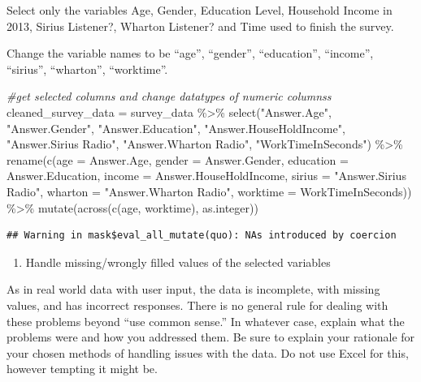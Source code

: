 \documentclass[
]{article}
\newenvironment{Shaded}{\begin{snugshade}}{\end{snugshade}}
\newcommand{\AttributeTok}[1]{\textcolor[rgb]{0.77,0.63,0.00}{#1}}
\newcommand{\CommentTok}[1]{\textcolor[rgb]{0.56,0.35,0.01}{\textit{#1}}}
\newcommand{\FunctionTok}[1]{\textcolor[rgb]{0.00,0.00,0.00}{#1}}
\newcommand{\NormalTok}[1]{#1}
\newcommand{\OtherTok}[1]{\textcolor[rgb]{0.56,0.35,0.01}{#1}}
\newcommand{\SpecialCharTok}[1]{\textcolor[rgb]{0.00,0.00,0.00}{#1}}
\newcommand{\StringTok}[1]{\textcolor[rgb]{0.31,0.60,0.02}{#1}}
\providecommand{\tightlist}{%
  \setlength{\itemsep}{0pt}\setlength{\parskip}{0pt}}
\begin{document}
Select only the variables Age, Gender, Education Level, Household Income
in 2013, Sirius Listener?, Wharton Listener? and Time used to finish the
survey.

Change the variable names to be ``age'', ``gender'', ``education'',
``income'', ``sirius'', ``wharton'', ``worktime''.

\begin{Shaded}
\begin{Highlighting}[]
\CommentTok{\#get selected columns and change datatypes of numeric columnss}
\NormalTok{cleaned\_survey\_data }\OtherTok{=}\NormalTok{ survey\_data }\SpecialCharTok{\%\textgreater{}\%} \FunctionTok{select}\NormalTok{(}\StringTok{"Answer.Age"}\NormalTok{, }\StringTok{"Answer.Gender"}\NormalTok{, }\StringTok{"Answer.Education"}\NormalTok{, }\StringTok{"Answer.HouseHoldIncome"}\NormalTok{, }\StringTok{"Answer.Sirius Radio"}\NormalTok{, }\StringTok{"Answer.Wharton Radio"}\NormalTok{, }\StringTok{"WorkTimeInSeconds"}\NormalTok{) }\SpecialCharTok{\%\textgreater{}\%} \FunctionTok{rename}\NormalTok{(}\FunctionTok{c}\NormalTok{(}\AttributeTok{age =}\NormalTok{ Answer.Age, }\AttributeTok{gender =}\NormalTok{ Answer.Gender, }\AttributeTok{education =}\NormalTok{ Answer.Education, }\AttributeTok{income =}\NormalTok{ Answer.HouseHoldIncome, }\AttributeTok{sirius =} \StringTok{"Answer.Sirius Radio"}\NormalTok{, }\AttributeTok{wharton =} \StringTok{"Answer.Wharton Radio"}\NormalTok{, }\AttributeTok{worktime =}\NormalTok{ WorkTimeInSeconds)) }\SpecialCharTok{\%\textgreater{}\%} \FunctionTok{mutate}\NormalTok{(}\FunctionTok{across}\NormalTok{(}\FunctionTok{c}\NormalTok{(age, worktime), as.integer))}
\end{Highlighting}
\end{Shaded}

\begin{verbatim}
## Warning in mask$eval_all_mutate(quo): NAs introduced by coercion
\end{verbatim}

\begin{enumerate}
\def\labelenumi{\roman{enumi}.}
\setcounter{enumi}{1}
\tightlist
\item
  Handle missing/wrongly filled values of the selected variables
\end{enumerate}

As in real world data with user input, the data is incomplete, with
missing values, and has incorrect responses. There is no general rule
for dealing with these problems beyond ``use common sense.'' In whatever
case, explain what the problems were and how you addressed them. Be sure
to explain your rationale for your chosen methods of handling issues
with the data. Do not use Excel for this, however tempting it might be.
\end{document}
